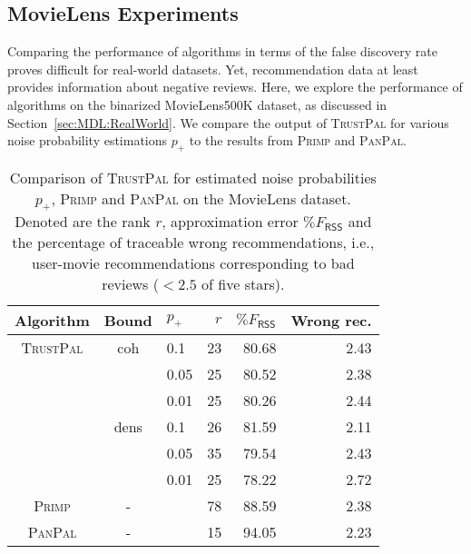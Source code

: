 \subsection{MovieLens Experiments}
Comparing the performance of algorithms in terms of the false discovery rate proves difficult for real-world datasets. Yet, recommendation data at least provides information about negative reviews. Here, we explore the performance of algorithms on the binarized MovieLens500K dataset, as discussed in Section~\ref{sec:MDL:RealWorld}. We compare the output of \textsc{TrustPal} for various noise probability estimations $p_+$ to the results from \textsc{Primp} and \textsc{PanPal}.
\begin{table}
\centering
	\begin{tabular}{cclrrr}\toprule
     Algorithm & Bound& $p_+$& $r$ & $\%F_{\mathsf{RSS}}$ & Wrong rec.\\ \midrule
\textsc{TrustPal} & coh & 0.1	&23	&80.68	&2.43\\
 & & 0.05	&25	&80.52	&2.38\\
 & & 0.01	&25	&80.26	&2.44\\
 & dens & 0.1	&26	&81.59	&2.11\\
 & & 0.05	&35	&79.54	&2.43\\
 & & 0.01	&25	&78.22	&2.72\\
\textsc{Primp} &-&& 78 & 88.59 & 2.38\\
\textsc{PanPal} &-&& 15 & 94.05 & 2.23\\
\bottomrule
\end{tabular}
\caption{Comparison of \textsc{TrustPal} for estimated noise probabilities $p_+$, \textsc{Primp} and \textsc{PanPal} on the MovieLens dataset. Denoted are the rank $r$, approximation error $\%F_{\mathsf{RSS}}$ and the percentage of traceable wrong recommendations, i.e., user-movie recommendations corresponding to bad reviews ($<2.5$ of five stars).}
\label{tbl:TP:movielens}
\end{table}

